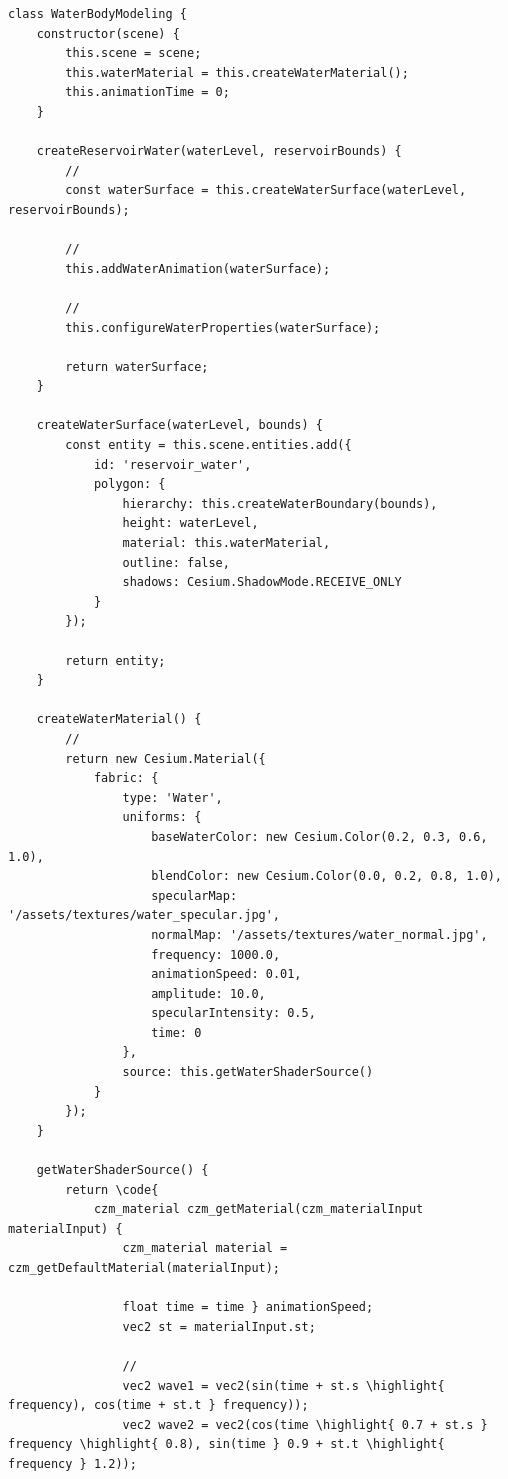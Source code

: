 \begin{lstlisting}[style=javascript]
class WaterBodyModeling {
    constructor(scene) {
        this.scene = scene;
        this.waterMaterial = this.createWaterMaterial();
        this.animationTime = 0;
    }
    
    createReservoirWater(waterLevel, reservoirBounds) {
        // 
        const waterSurface = this.createWaterSurface(waterLevel, reservoirBounds);
        
        // 
        this.addWaterAnimation(waterSurface);
        
        // 
        this.configureWaterProperties(waterSurface);
        
        return waterSurface;
    }
    
    createWaterSurface(waterLevel, bounds) {
        const entity = this.scene.entities.add({
            id: 'reservoir_water',
            polygon: {
                hierarchy: this.createWaterBoundary(bounds),
                height: waterLevel,
                material: this.waterMaterial,
                outline: false,
                shadows: Cesium.ShadowMode.RECEIVE_ONLY
            }
        });
        
        return entity;
    }
    
    createWaterMaterial() {
        // 
        return new Cesium.Material({
            fabric: {
                type: 'Water',
                uniforms: {
                    baseWaterColor: new Cesium.Color(0.2, 0.3, 0.6, 1.0),
                    blendColor: new Cesium.Color(0.0, 0.2, 0.8, 1.0),
                    specularMap: '/assets/textures/water_specular.jpg',
                    normalMap: '/assets/textures/water_normal.jpg',
                    frequency: 1000.0,
                    animationSpeed: 0.01,
                    amplitude: 10.0,
                    specularIntensity: 0.5,
                    time: 0
                },
                source: this.getWaterShaderSource()
            }
        });
    }
    
    getWaterShaderSource() {
        return \code{
            czm_material czm_getMaterial(czm_materialInput materialInput) {
                czm_material material = czm_getDefaultMaterial(materialInput);
                
                float time = time } animationSpeed;
                vec2 st = materialInput.st;
                
                // 
                vec2 wave1 = vec2(sin(time + st.s \highlight{ frequency), cos(time + st.t } frequency));
                vec2 wave2 = vec2(cos(time \highlight{ 0.7 + st.s } frequency \highlight{ 0.8), sin(time } 0.9 + st.t \highlight{ frequency } 1.2));
                

\end{lstlisting}
